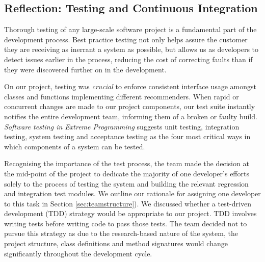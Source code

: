 \documentclass{l3proj}
\begin{document}
\subsection{Reflection: Testing and Continuous Integration}
\label{sec:testing}
% 




Thorough testing of any large-scale software project is a fundamental part of the development process. Best practice testing not only helps assure the customer they are receiving as inerrant a system as possible, but allows us as developers to detect issues earlier in the process, reducing the cost of correcting faults than if they were discovered further on in the development. 

On our project, testing was \textit{crucial} to enforce consistent interface usage amongst classes and functions implementing different recommenders. When rapid or concurrent changes are made to our project components, our test suite instantly notifies the entire development team, informing them of a broken or faulty build. \textit{Software testing in Extreme Programming} \cite{SoftwareTesting} suggests unit testing, integration testing, system testing and acceptance testing as the four most critical ways in which components of a system can be tested. 

Recognising the importance of the test process, the team made the decision at the mid-point of the project to dedicate the majority of one developer's efforts solely to the process of testing the system and building the relevant regression and integration test modules. We outline our rationale for assigning one developer to this task in Section \ref{sec:teamstructure}). We discussed whether a test-driven development (TDD) strategy would be appropriate to our project. TDD involves writing tests before writing code to pass those tests. The team decided not to pursue this strategy as due to the research-based nature of the system, the project structure, class definitions and method signatures would change significantly throughout the development cycle. 
\end{document}
